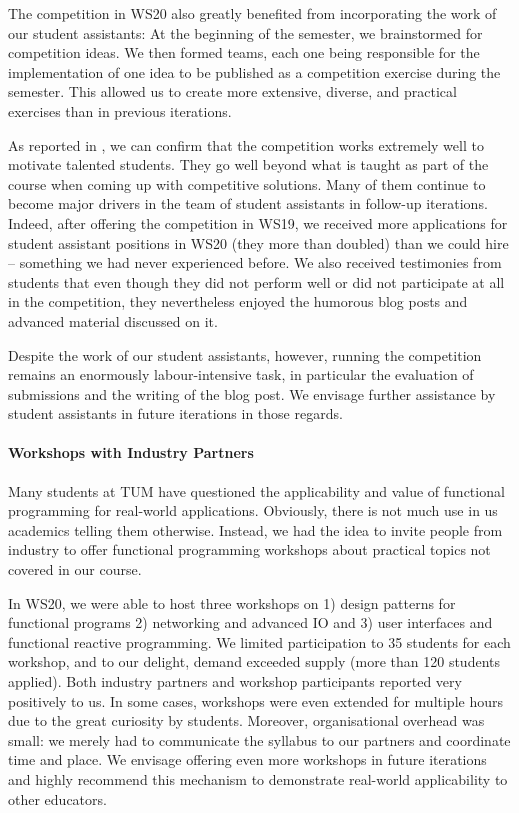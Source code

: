 The competition in WS20 also greatly benefited from incorporating the work of our student assistants:
At the beginning of the semester,
we brainstormed for competition ideas.
We then formed teams, each one being responsible for the
implementation of one idea to be published as a competition exercise during the semester.
This allowed us to create more extensive, diverse,
and practical exercises than in previous iterations.

As reported in \cite{next_1100},
we can confirm that the competition works extremely well to motivate talented students.
They go well beyond what is taught as part of the course when coming up with competitive solutions.
Many of them continue to become major drivers in
the team of student assistants in follow-up iterations.
Indeed, after offering the competition in WS19,
we received more applications for student assistant positions in WS20 (they more than doubled) than we could hire -- something we had never experienced before.
We also received testimonies from students that even though they did not perform well or did not participate at all in the competition,
they nevertheless enjoyed the humorous blog posts and advanced material discussed on it.

Despite the work of our student assistants,
however,
running the competition remains an enormously labour-intensive task,
in particular the evaluation of submissions and
the writing of the blog post.
We envisage further assistance by student assistants in future iterations in those regards.

\paragraph{Workshops with Industry Partners}
Many students at TUM have questioned the applicability and value of functional programming for real-world applications.
Obviously, there is not much use in us academics telling
them otherwise.
Instead, we had the idea to invite people from industry
to offer functional programming workshops about
practical topics not covered in our course.

In WS20,
we were able to host three workshops on 1) design patterns
for functional programs 2) networking and advanced IO and 3) user interfaces and functional reactive programming.
We limited participation to 35 students for each workshop,
and to our delight, demand exceeded supply (more than 120 students applied).
Both industry partners and workshop participants
reported very positively to us.
In some cases,
workshops were even extended for multiple hours due to the great curiosity by students.
Moreover, organisational overhead was small:
we merely had to communicate the syllabus to our partners and coordinate time and place.
We envisage offering even more workshops in future iterations and highly recommend this mechanism to demonstrate real-world applicability to other educators.

